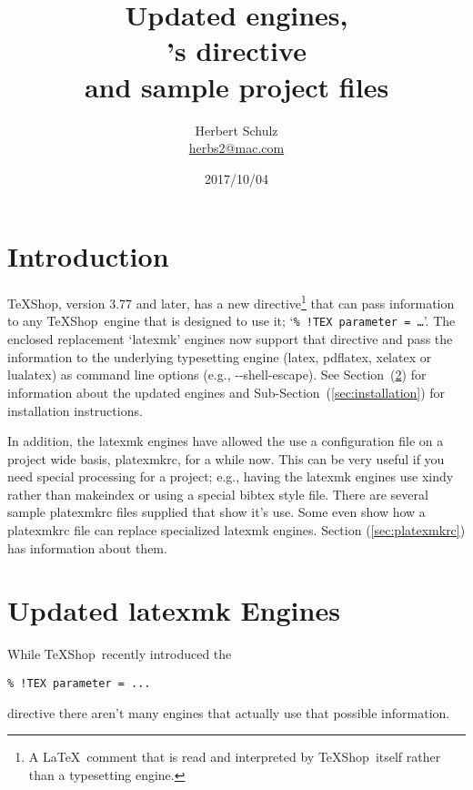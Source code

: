 \documentclass[11pt]{article}
\title{Updated \cmd{latexmk} engines,\\\TS's \cmd{parameter} directive\\and sample project files}
\author{Herbert Schulz\\\small\href{mailto:herbs2@mac.com}{herbs2@mac.com}}
\date{2017/10/04}
\newcommand{\cmd}[1]{\textsf{#1}}
\newcommand{\TS}{\textsf{\TeX Shop}}
\begin{document}
\maketitle
\thispagestyle{empty}

\section{Introduction}
\TS, version 3.77 and later, has a new directive\footnote{A \LaTeX\ comment that is read and interpreted by \TS\ itself rather than a typesetting engine.} that can pass information to any \TS\ engine that is designed to use it; `\verb|% !TEX parameter = …|'. 
The enclosed replacement `\cmd{latexmk}' engines now support that directive and pass the information to the underlying typesetting engine (\cmd{latex}, \cmd{pdflatex}, \cmd{xelatex} or \cmd{lualatex}) as command line options (e.g., \cmd{-{}-shell-escape}). See Section~(\ref{sec:latexmk}) for information about the updated engines and Sub-Section~(\ref{sec:installation}) for installation instructions.

In addition, the \cmd{latexmk} engines have allowed the use a configuration file on a project wide basis, \cmd{platexmkrc}, for a while now. This can be very useful if you need special  processing for a project; e.g., having the \cmd{latexmk} engines use \cmd{xindy} rather than \cmd{makeindex} or using a special \cmd{bibtex} style file. There are several sample \cmd{platexmkrc} files supplied that show it's use. Some even show how a \cmd{platexmkrc} file can replace specialized \cmd{latexmk} engines. Section (\ref{sec:platexmkrc}) has information about them.

\section{Updated \cmd{latexmk} Engines}\label{sec:latexmk}

While \TS\ recently introduced the 
\begin{verbatim}
% !TEX parameter = ...
\end{verbatim}
directive there aren't many engines that actually use that possible information. 
\end{document}

